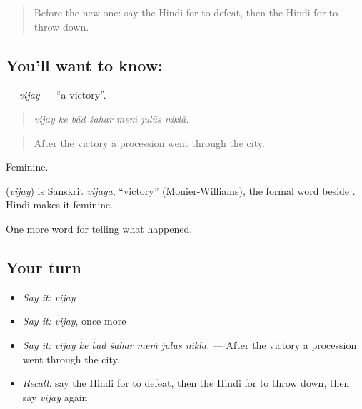 \label{lesson:HI-C323-vijay}



\begin{quote}
Before the new one: say the Hindi for to defeat, then the Hindi for to throw down.
\end{quote}

\subsection*{You'll want to know: }
\textbf{} — \emph{vijay} — \textquotedblleft{}a victory\textquotedblright{}.

\begin{quote}
      
\end{quote}

\begin{quote}
\emph{vijay ke bād śahar meṁ julūs niklā.}
\end{quote}

\begin{quote}
After the victory a procession went through the city.
\end{quote}

Feminine.

\begin{cousinweb}
\textbf{} (\emph{vijay}) is Sanskrit \emph{vijaya}, \textquotedblleft{}victory\textquotedblright{} (Monier-Williams), the formal word beside \textbf{}. Hindi makes it feminine.
\end{cousinweb}

\begin{grammarlens}[title={What you've built}]
One more word for telling what happened.
\end{grammarlens}

\subsection*{Your turn}
\begin{itemize}
\raggedright
  \item \emph{Say it:} \emph{vijay}
  \item \emph{Say it:} \emph{vijay}, once more
  \item \emph{Say it:} \emph{vijay ke bād śahar meṁ julūs niklā.} — After the victory a procession went through the city.
  \item \emph{Recall:} say the Hindi for to defeat, then the Hindi for to throw down, then say \emph{vijay} again
\end{itemize}

